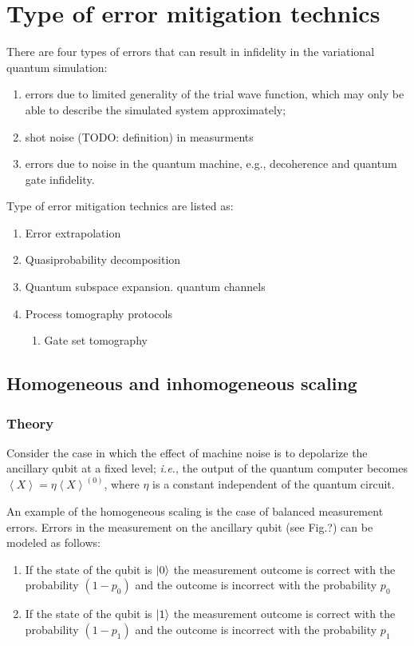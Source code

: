 \documentclass[11pt, oneside]{article}   	%
\begin{document}
\section{Type of error mitigation technics}
There are four types of errors that can result in infidelity in the variational quantum simulation: 
\begin{enumerate}
\item errors due to limited generality of the trial wave function, which may only be able to describe the simulated system approximately; 
\item shot noise (TODO: definition) in measurments 
\item errors due to noise in the quantum machine, e.g., decoherence and quantum gate infidelity.
\end{enumerate}

Type of error mitigation technics are listed as:
\begin{enumerate}
\item Error extrapolation
\item Quasiprobability decomposition
\item Quantum subspace expansion. quantum channels
\item Process tomography protocols
\begin{enumerate}
\item Gate set tomography
\end{enumerate}
\end{enumerate}

\subsection{Homogeneous and inhomogeneous scaling}
\subsubsection{Theory}
Consider the case in which the effect of machine noise is to depolarize the ancillary qubit at a fixed level; \textit{i.e.}, the output of the quantum computer becomes 
$\left< X \right> = \eta \left< X \right>^{(0)}$, 
where $\eta$ is a constant independent of the quantum circuit. 

An example of the homogeneous scaling is the case of balanced measurement errors. 
Errors in the measurement on the ancillary qubit (see Fig.?) can be modeled as follows: 
\begin{enumerate}
\item
If the state of the qubit is $\ket{0}$ the measurement outcome is correct with the probability $(1-p_0)$ and the outcome is incorrect with the probability $p_0$
\item
If the state of the qubit is $\ket{1}$ the measurement outcome is correct with the probability $(1-p_1)$ and the outcome is incorrect with the probability $p_1$
\end{enumerate}
\end{document}
